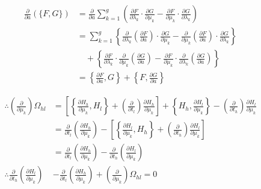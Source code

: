 \begin{align*}
    \frac{\partial}{\partial a} (\{F, G\}) &= \frac{\partial}{\partial a} \sum_{k=1}^g \left( \frac{\partial F}{\partial \lambda_k} \cdot \frac{\partial G}{\partial \mu_k} - \frac{\partial F}{\partial \mu_k} \cdot \frac{\partial G}{\partial \lambda_k} \right) \\
    &= \sum_{k=1}^g \left\{ \frac{\partial}{\partial \lambda_k} \left( \frac{\partial F}{\partial a} \right) \cdot \frac{\partial G}{\partial \mu_k} - \frac{\partial}{\partial \mu_k} \left( \frac{\partial F}{\partial a} \right) \cdot \frac{\partial G}{\partial \lambda_k} \right\} \\
    &\quad + \left\{ \frac{\partial F}{\partial \lambda_k} \cdot \frac{\partial}{\partial \mu_k} \left( \frac{\partial G}{\partial a} \right) - \frac{\partial F}{\partial \mu_k} \cdot \frac{\partial}{\partial \lambda_k} \left( \frac{\partial G}{\partial a} \right) \right\} \\
    &= \left\{ \frac{\partial F}{\partial a}, G \right\} + \left\{ F, \frac{\partial G}{\partial a} \right\}
\end{align*}

\begin{align*}
    \therefore \left( \frac{\partial}{\partial \mu_k} \right) \Omega_{hl} &= \left[ \left\{ \frac{\partial H_h}{\partial \mu_k}, H_l \right\} + \left( \frac{\partial}{\partial t_l} \right) \frac{\partial H_h}{\partial \mu_k} \right] + \left\{ H_h, \frac{\partial H_l}{\partial \mu_k} \right\} - \left( \frac{\partial}{\partial t_h} \right) \frac{\partial H_l}{\partial \mu_k} \\
    &= \frac{\partial}{\partial t_l} \left( \frac{\partial H_h}{\partial \mu_k} \right) - \left[ \left\{ \frac{\partial H_l}{\partial \mu_k}, H_h \right\} + \left( \frac{\partial}{\partial t_h} \right) \frac{\partial H_l}{\partial \mu_k} \right] \\
    &= \frac{\partial}{\partial t_l} \left( \frac{\partial H_h}{\partial \mu_k} \right) - \frac{\partial}{\partial t_h} \left( \frac{\partial H_l}{\partial \mu_k} \right) \\
    \therefore \frac{\partial}{\partial t_h} \left( \frac{\partial H_l}{\partial \mu_k} \right) &- \frac{\partial}{\partial t_l} \left( \frac{\partial H_h}{\partial \mu_k} \right) + \left( \frac{\partial}{\partial \mu_k} \right) \Omega_{hl} = 0
\end{align*}

